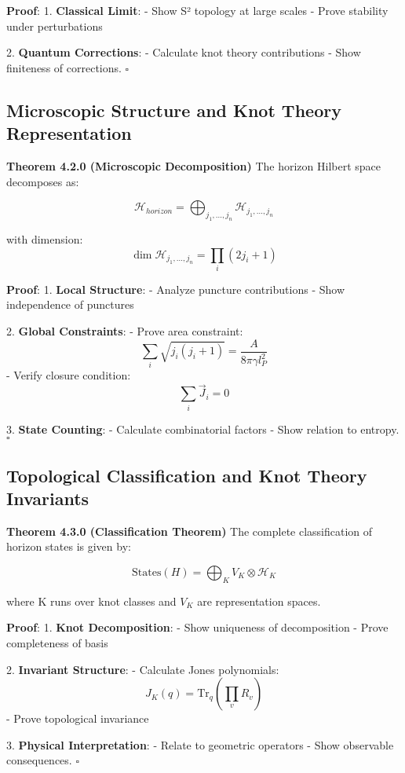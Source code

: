 \documentclass[12pt,a4paper]{article}
\begin{document}
\textbf{Proof}:
1. \textbf{Classical Limit}:
   - Show S² topology at large scales
   - Prove stability under perturbations

2. \textbf{Quantum Corrections}:
   - Calculate knot theory contributions
   - Show finiteness of corrections. $\square$

\subsection{Microscopic Structure and Knot Theory Representation}

\textbf{Theorem 4.2.0 (Microscopic Decomposition)}
The horizon Hilbert space decomposes as:

\[
\mathcal{H}_{horizon} = \bigoplus_{j_1,...,j_n} \mathcal{H}_{j_1,...,j_n}
\]

with dimension:
\[
\dim \mathcal{H}_{j_1,...,j_n} = \prod_i (2j_i + 1)
\]

\textbf{Proof}:
1. \textbf{Local Structure}:
   - Analyze puncture contributions
   - Show independence of punctures

2. \textbf{Global Constraints}:
   - Prove area constraint:
     \[
     \sum_i \sqrt{j_i(j_i+1)} = \frac{A}{8\pi\gamma l_P^2}
     \]
   - Verify closure condition:
     \[
     \sum_i \vec{J}_i = 0
     \]

3. \textbf{State Counting}:
   - Calculate combinatorial factors
   - Show relation to entropy. $\square$

\subsection{Topological Classification and Knot Theory Invariants}

\textbf{Theorem 4.3.0 (Classification Theorem)}
The complete classification of horizon states is given by:

\[
\text{States}(H) = \bigoplus_K V_K \otimes \mathcal{H}_K
\]

where K runs over knot classes and $V_K$ are representation spaces.

\textbf{Proof}:
1. \textbf{Knot Decomposition}:
   - Show uniqueness of decomposition
   - Prove completeness of basis

2. \textbf{Invariant Structure}:
   - Calculate Jones polynomials:
     \[
     J_K(q) = \text{Tr}_q(\prod_v R_v)
     \]
   - Prove topological invariance

3. \textbf{Physical Interpretation}:
   - Relate to geometric operators
   - Show observable consequences. $\square$
\end{document}
